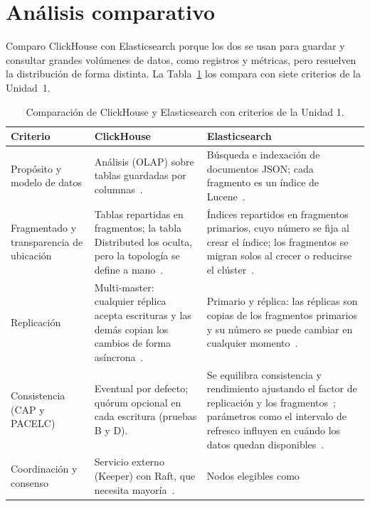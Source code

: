 \documentclass[12pt,a4paper]{article}
\begin{document}
\section{Análisis comparativo}

Comparo ClickHouse con Elasticsearch porque los dos se usan para guardar
y consultar grandes volúmenes de datos, como registros y métricas, pero
resuelven la distribución de forma distinta. La
Tabla~\ref{tab:comparacion} los compara con siete criterios de la
Unidad~1.

\begin{table}[htbp]
  \centering
  \caption{Comparación de ClickHouse y Elasticsearch con criterios de la
  Unidad 1.}
  \label{tab:comparacion}
  \small
  \begin{tabularx}{\linewidth}{@{}>{\raggedright\arraybackslash}p{2.6cm} X X@{}}
    \toprule
    \textbf{Criterio} & \textbf{ClickHouse} & \textbf{Elasticsearch} \\
    \midrule
    Propósito y modelo de datos & Análisis (OLAP) sobre tablas guardadas
      por columnas~\cite{schulze2024}. & Búsqueda e indexación de
      documentos JSON; cada fragmento es un índice de
      Lucene~\cite[p.~2377]{calderon2024}. \\
    Fragmentado y transparencia de ubicación & Tablas repartidas en
      fragmentos; la tabla Distributed los oculta, pero la topología se
      define a mano~\cite[p.~3732]{schulze2024}. & Índices repartidos en
      fragmentos primarios, cuyo número se fija al crear el índice; los
      fragmentos se migran solos al crecer o reducirse el
      clúster~\cite[pp.~2377, 2383]{calderon2024}. \\
    Replicación & Multi-master: cualquier réplica acepta escrituras y las
      demás copian los cambios de forma
      asíncrona~\cite[p.~3736]{schulze2024}. & Primario y réplica: las
      réplicas son copias de los fragmentos primarios y su número se
      puede cambiar en cualquier
      momento~\cite[pp.~2377, 2383]{calderon2024}. \\
    Consistencia (CAP y PACELC) & Eventual por defecto; quórum opcional en
      cada escritura (pruebas B y D). & Se equilibra consistencia y
      rendimiento ajustando el factor de replicación y los
      fragmentos~\cite[p.~2383]{calderon2024}; parámetros como el
      intervalo de refresco influyen en cuándo los datos quedan
      disponibles~\cite[p.~4]{haugerud2022}. \\
    Coordinación y consenso & Servicio externo (Keeper) con Raft, que
      necesita mayoría~\cite[p.~3736]{schulze2024}. & Nodos elegibles como

\end{tabularx}
\end{table}
\end{document}

